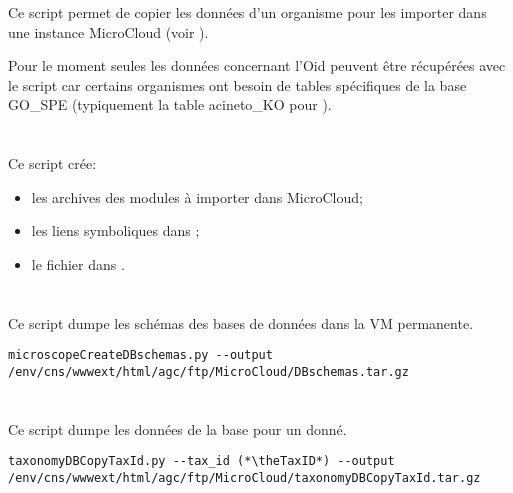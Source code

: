 Ce script permet de copier les données d'un organisme pour les importer dans une instance MicroCloud (voir ).

\begin{warningbox}
    Pour le moment seules les données concernant l'Oid \theOid{} peuvent être récupérées avec le script  car certains organismes ont besoin de tables spécifiques de la base GO\_SPE (typiquement la table acineto\_KO pour \theOrg{}).
\end{warningbox}

\section{}

Ce script crée:
\begin{itemize}
    \item les archives des modules à importer dans MicroCloud;
    \item les liens symboliques dans ;
    \item le fichier  dans .
\end{itemize}

\section{}\label{sec:microscopeCreateDBschemas}

Ce script dumpe les schémas des bases de données dans la VM permanente.

\begin{lstlisting}[style=bash]
microscopeCreateDBschemas.py --output /env/cns/wwwext/html/agc/ftp/MicroCloud/DBschemas.tar.gz
\end{lstlisting}

\section{}

Ce script dumpe les données de la base  pour un  donné.

\begin{lstlisting}[style=bash]
taxonomyDBCopyTaxId.py --tax_id (*\theTaxID*) --output /env/cns/wwwext/html/agc/ftp/MicroCloud/taxonomyDBCopyTaxId.tar.gz
\end{lstlisting}
